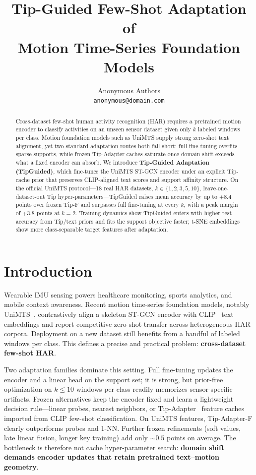 \documentclass[11pt]{article}
\title{\vspace{-1.2em}Tip-Guided Few-Shot Adaptation of\\ Motion Time-Series Foundation Models}
\author{
  Anonymous Authors\\
  \texttt{anonymous@domain.com}
}
\date{}
\begin{document}
\maketitle

\begin{abstract}
Cross-dataset few-shot human activity recognition (HAR) requires a pretrained motion encoder to classify activities on an unseen sensor dataset given only \(k\) labeled windows per class.
Motion foundation models such as UniMTS supply strong zero-shot text alignment, yet two standard adaptation routes both fall short: full fine-tuning overfits sparse supports, while frozen Tip-Adapter caches saturate once domain shift exceeds what a fixed encoder can absorb.
We introduce \textbf{Tip-Guided Adaptation (TipGuided)}, which fine-tunes the UniMTS ST-GCN encoder under an explicit Tip-cache prior that preserves CLIP-aligned text scores and support affinity structure.
On the official UniMTS protocol---18 real HAR datasets, \(k\in\{1,2,3,5,10\}\), leave-one-dataset-out Tip hyper-parameters---TipGuided raises mean accuracy by up to \(+8.4\) points over frozen Tip-F and surpasses full fine-tuning at every \(k\), with a peak margin of \(+3.8\) points at \(k=2\).
Training dynamics show TipGuided enters with higher test accuracy from Tip/text priors and fits the support objective faster; t-SNE embeddings show more class-separable target features after adaptation.
\end{abstract}

\section{Introduction}
\label{sec:intro}

Wearable IMU sensing powers healthcare monitoring, sports analytics, and mobile context awareness.
Recent motion time-series foundation models, notably UniMTS~\cite{unimts}, contrastively align a skeleton ST-GCN encoder with CLIP~\cite{clip} text embeddings and report competitive zero-shot transfer across heterogeneous HAR corpora.
Deployment on a new dataset still benefits from a handful of labeled windows per class.
This defines a precise and practical problem: \textbf{cross-dataset few-shot HAR}.

Two adaptation families dominate this setting.
Full fine-tuning updates the encoder and a linear head on the support set; it is strong, but prior-free optimization on \(k\le 10\) windows per class readily memorizes sensor-specific artifacts.
Frozen alternatives keep the encoder fixed and learn a lightweight decision rule---linear probes, nearest neighbors, or Tip-Adapter~\cite{tipadapter} feature caches imported from CLIP few-shot classification.
On UniMTS features, Tip-Adapter-F clearly outperforms probes and 1-NN.
Further frozen refinements (soft values, late linear fusion, longer key training) add only \(\sim\!0.5\) points on average.
The bottleneck is therefore not cache hyper-parameter search: \textbf{domain shift demands encoder updates that retain pretrained text--motion geometry}.
\end{document}
